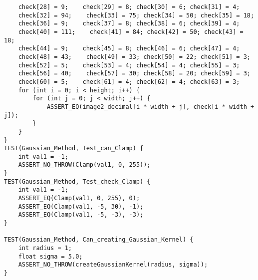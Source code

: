 \documentclass{report}
\begin{document}
\begin{lstlisting}
    check[28] = 9;    check[29] = 8; check[30] = 6; check[31] = 4;
    check[32] = 94;    check[33] = 75; check[34] = 50; check[35] = 18;
    check[36] = 9;    check[37] = 8; check[38] = 6; check[39] = 4;
    check[40] = 111;    check[41] = 84; check[42] = 50; check[43] = 18;
    check[44] = 9;    check[45] = 8; check[46] = 6; check[47] = 4;
    check[48] = 43;    check[49] = 33; check[50] = 22; check[51] = 3;
    check[52] = 5;    check[53] = 4; check[54] = 4; check[55] = 3;
    check[56] = 40;    check[57] = 30; check[58] = 20; check[59] = 3;
    check[60] = 5;    check[61] = 4; check[62] = 4; check[63] = 3;
    for (int i = 0; i < height; i++) {
        for (int j = 0; j < width; j++) {
            ASSERT_EQ(image2_decimal[i * width + j], check[i * width + j]);
        }
    }
}
TEST(Gaussian_Method, Test_can_Clamp) {
    int val1 = -1;
    ASSERT_NO_THROW(Clamp(val1, 0, 255));
}
TEST(Gaussian_Method, Test_check_Clamp) {
    int val1 = -1;
    ASSERT_EQ(Clamp(val1, 0, 255), 0);
    ASSERT_EQ(Clamp(val1, -5, 30), -1);
    ASSERT_EQ(Clamp(val1, -5, -3), -3);
}

TEST(Gaussian_Method, Can_creating_Gaussian_Kernel) {
    int radius = 1;
    float sigma = 5.0;
    ASSERT_NO_THROW(createGaussianKernel(radius, sigma));
}

\end{lstlisting}
\end{document}
